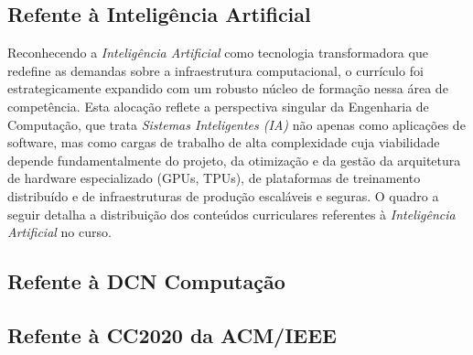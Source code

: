 \subsection{Refente à Inteligência Artificial}
\label{sec:sobre_IA}

Reconhecendo a \textit{Inteligência Artificial} como tecnologia transformadora que redefine as demandas sobre a infraestrutura computacional, o currículo foi estrategicamente expandido com um robusto núcleo de formação nessa área de competência. Esta alocação reflete a perspectiva singular da Engenharia de Computação, que trata \textit{Sistemas Inteligentes (IA)} não apenas como aplicações de software, mas como cargas de trabalho de alta complexidade cuja viabilidade depende fundamentalmente do projeto, da otimização e da gestão da arquitetura de hardware especializado (GPUs, TPUs), de plataformas de treinamento distribuído e de infraestruturas de produção escaláveis e seguras. O quadro a seguir detalha a distribuição dos conteúdos curriculares referentes à \textit{Inteligência Artificial} no curso.



\subsection{Refente à DCN Computação}



\subsection{Refente à CC2020 da ACM/IEEE}




